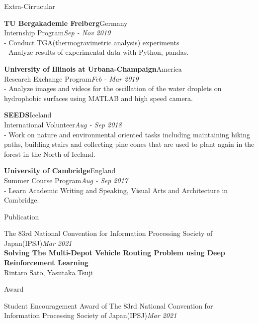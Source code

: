 \documentclass{resume} %
\begin{document}
\begin{rSection}{Extra-Cirrucular} 
\item {\bf TU Bergakademie Freiberg}\hfill {Germany}\\Internship Program\hfill {\em Sep - Nov 2019}\\- Conduct TGA(thermogravimetric analysis) experiments\\- Analyze results of experimental data with Python, pandas.
\item {\bf University of Illinois at Urbana-Champaign}\hfill {America}\\Research Exchange Program\hfill {\em Feb - Mar 2019}\\- Analyze images and videos for the oscillation of the water droplets on hydrophobic surfaces using MATLAB and high speed camera.
\item {\bf SEEDS}\hfill {Iceland}\\International Volunteer\hfill {\em Aug - Sep 2018}\\- Work on nature and environmental oriented tasks including maintaining hiking paths, building stairs and collecting pine cones that are used to plant again in the forest in the North of Iceland.
\item {\bf University of Cambridge}\hfill {England}\\Summer Course Program\hfill {\em Aug - Sep 2017}\\- Learn Academic Writing and Speaking, Visual Arts and Architecture in Cambridge.
\end{rSection}


\begin{rSection}{Publication}
 \item The 83rd National Convention for Information Processing Society of Japan(IPSJ)\hfill {\em Mar 2021}\\{\bf Solving The Multi-Depot Vehicle Routing Problem using Deep Reinforcement Learning}\\\hfill {Rintaro Sato, Yasutaka Tsuji}
\end{rSection}

\begin{rSection}{Award}
 \item Student Encouragement Award of The 83rd National Convention for\\ Information Processing Society of Japan(IPSJ)\hfill {\em Mar 2021}
\end{rSection}
\end{document}
